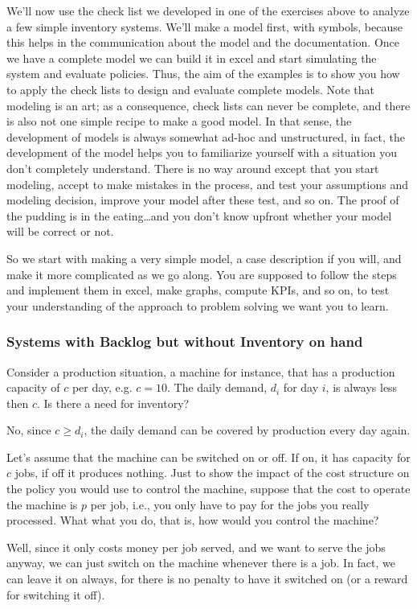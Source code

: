 We'll now use the check list we developed in one of the exercises
above to analyze a few simple inventory systems. We'll make a model
first, with symbols, because this helps in the communication about the
model and the documentation. Once we have a complete model we can
build it in excel and start simulating the system and evaluate
policies. Thus, the aim of the examples is to show you how to apply
the check lists to design and evaluate complete models. Note that
modeling is an art; as a consequence, check lists can never be
complete, and there is also not one simple recipe to make a good
model. In that sense, the development of models is always somewhat
ad-hoc and unstructured, in fact, the development of the model helps
you to familiarize yourself with a situation you don't completely
understand. There is no way around except that you start modeling,
accept to make mistakes in the process, and test your assumptions and
modeling decision, improve your model after these test, and so on. The
proof of the pudding is in the eating\ldots and you don't know upfront
whether your model will be correct or not.

So we start with making a very simple model, a case description if you
will, and make it more complicated as we go along.  You are supposed
to follow the steps and implement them in excel, make graphs, compute
KPIs, and so on, to test your understanding of the approach to problem
solving we want you to learn.

\subsubsection{Systems with Backlog but without Inventory on hand}

\begin{question}
  Consider a production situation, a  machine for instance, that has a
  production capacity of  $c$ per day, e.g. $c=10$.  The daily demand,
  $d_i$ for day $i$, is always less then $c$. Is there a need for inventory?
  \begin{solution}
No, since $c\geq d_i$, the daily demand can be covered by production every day again.     
  \end{solution}
\end{question}

\begin{question}
  Let's assume that the machine can be switched on or off.  If on, it
  has capacity for $c$ jobs, if off it produces nothing.  Just to show
  the impact of the cost structure on the policy you would use to
  control the machine, suppose that the cost to operate the machine is
  $p$ per job, i.e., you only have to pay for the jobs you really
  processed. What what you do, that is, how would you control the
  machine?
  \begin{solution}
    Well, since it only costs money per job served, and we want to
    serve the jobs anyway, we can just switch on the machine whenever
    there is a job. In fact, we can leave it on always, for there is
    no penalty to have it switched on (or a reward for switching it
    off).
  \end{solution}
\end{question}

